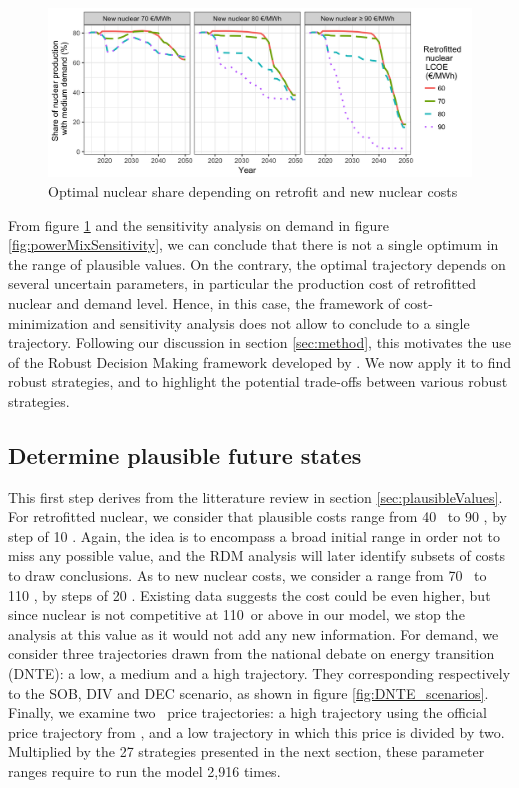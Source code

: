 \begin{figure}[!ht]
	\centering
	\includegraphics[width=12cm]{figures/nukeShare2_MedD.png}
	\caption{Optimal nuclear share depending on retrofit and new nuclear costs}
	\label{fig:nukeShare}
\end{figure}

From figure \ref{fig:nukeShare} and the sensitivity analysis on demand in figure \ref{fig:powerMixSensitivity}, we can conclude that there is not a single optimum in the range of plausible values. On the contrary, the optimal trajectory depends on several uncertain parameters, in particular the production cost of retrofitted nuclear and demand level. Hence, in this case, the framework of cost-minimization and sensitivity analysis does not allow to conclude to a single trajectory. Following our discussion in section \ref{sec:method}, this motivates the use of the Robust Decision Making framework developed by \citet{Lempert2006}. We now apply it to find robust strategies, and to highlight the potential trade-offs between various robust strategies.

\subsection{Determine plausible future states}

This first step derives from the litterature review in section \ref{sec:plausibleValues}. 
For retrofitted nuclear, we consider that plausible costs range from 40 \emwh\ to 90 \emwh, by step of 10 \emwh. Again, the idea is to encompass a broad initial range in order not to miss any possible value, and the RDM analysis will later identify subsets of costs to draw conclusions. 
As to new nuclear costs, we consider a range from 70 \emwh\ to 110 \emwh, by steps of 20 \emwh. Existing data suggests the cost could be even higher, but since nuclear is not competitive at 110\emwh\ or above in our model, we stop the analysis at this value as it would not add any new information.
For demand, we consider three trajectories drawn from the national debate on energy transition (DNTE): a low, a medium and a high trajectory. They corresponding respectively to the SOB, DIV and DEC scenario, as shown in figure \ref{fig:DNTE_scenarios}.
Finally, we examine two \coo\ price trajectories: a high trajectory using the official price trajectory from \citet{Quinet2009}, and a low trajectory in which this price is divided by two.
Multiplied by the 27 strategies presented in the next section, these parameter ranges require to run the model 2,916 times. 


